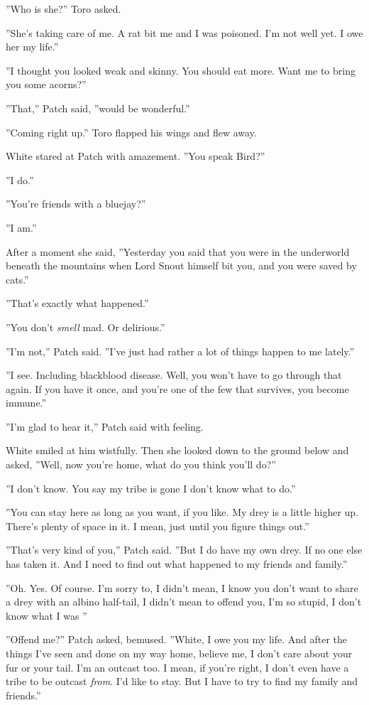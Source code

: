 \documentclass[12pt]{book}
\begin{document}
''Who is she?'' Toro asked.

''She's taking care of me. A rat bit me and I was poisoned. I'm not well yet. I owe her my life.''

''I thought you looked weak and skinny. You should eat more. Want me to bring you some acorns?''

''That,'' Patch said, ''would be wonderful.''

''Coming right up.'' Toro flapped his wings and flew away.

White stared at Patch with amazement. ''You speak Bird?''

''I do.''

''You're friends with a bluejay?''

''I am.''

After a moment she said, ''Yesterday you said that you were in the underworld beneath the mountains when Lord Snout himself bit you, and you were saved by cats.''

''That's exactly what happened.''

''You don't {\it smell} mad. Or delirious.''

''I'm not,'' Patch said. ''I've just had rather a lot of things happen to me lately.''

''I see. Including blackblood disease. Well, you won't have to go through that again. If you have it once, and you're one of the few that survives, you become immune.''

''I'm glad to hear it,'' Patch said with feeling.

White smiled at him wistfully. Then she looked down to the ground below and asked, ''Well, now you're home, what do you think you'll do?''

''I don't know. You say my tribe is gone %
I don't know what to do.''

''You can stay here as long as you want, if you like. My drey is a little higher up. There's plenty of space in it. I mean, just until you figure things out.''

''That's very kind of you,'' Patch said. ''But I do have my own drey. If no one else has taken it. And I need to find out what happened to my friends and family.''

''Oh. Yes. Of course. I'm sorry to, I didn't mean, I know you don't want to share a drey with an albino half-tail, I didn't mean to offend you, I'm so stupid, I don't know what I was %
''

''Offend me?'' Patch asked, bemused. ''White, I owe you my life. And after the things I've seen and done on my way home, believe me, I don't care about your fur or your tail. I'm an outcast too. I mean, if you're right, I don't even have a tribe to be outcast {\it from}. I'd like to stay. But I have to try to find my family and friends.''
\end{document}

